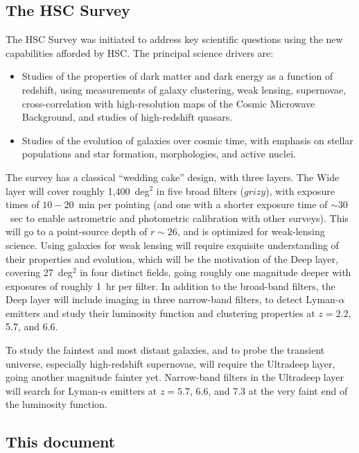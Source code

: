 \documentclass[12pt]{article}
\begin{document}
\subsection{The HSC Survey}


The HSC Survey was initiated to address key scientific questions using the new capabilities afforded by HSC.
The principal science drivers are:
\begin{itemize}
\item Studies of the properties of dark matter and dark energy as a
  function of redshift, using measurements of galaxy clustering, weak
  lensing, supernovae, cross-correlation with high-resolution maps
  of the Cosmic Microwave Background, and studies of high-redshift
  quasars.
\item Studies of the evolution of galaxies over cosmic time, with
  emphasis on stellar populations and star formation, morphologies, and
  active nuclei.
\end{itemize}

The survey has a classical ``wedding cake'' design, with three layers.  The Wide layer will cover roughly
1,400~deg$^2$ in five broad filters ($grizy$), with exposure times of $10-20$~min per pointing (and one with a
shorter exposure time of $\sim 30$~sec to enable astrometric and photometric calibration with other surveys).
This will go to a point-source depth of $r\sim 26$, and is optimized for weak-lensing science.  Using galaxies
for weak lensing will require exquisite understanding of their properties and evolution, which will be the
motivation of the Deep layer, covering 27~deg$^2$ in four distinct fields, going roughly one magnitude deeper
with exposures of roughly 1~hr per filter.  In addition to the broad-band filters, the Deep layer will include
imaging in three narrow-band filters, to detect Lyman-$\alpha$ emitters and study their luminosity function
and clustering properties at $z = 2.2$, 5.7, and 6.6.

To study the faintest and most distant galaxies, and to probe the
transient universe, especially high-redshift supernovae, will require
the Ultradeep layer, going another magnitude fainter yet.  Narrow-band
filters in the Ultradeep layer will search for Lyman-$\alpha$
emitters at $z = 5.7$, 6.6, and 7.3 at the very faint end of the
luminosity function.

\subsection{This document}
\end{document}
